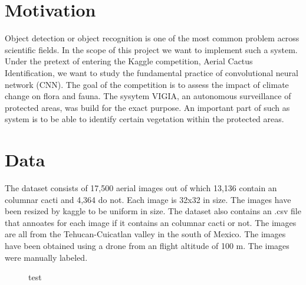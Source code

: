 \newcommand{\feat}{\texttt}







\section{Motivation}
Object detection or object recognition is one of the most common problem across scientific fields. In the scope of this project we want to implement such a system. Under the pretext of entering the Kaggle competition, Aerial Cactus Identification, we want to study the fundamental practice of convolutional neural network (CNN). The goal of the competition is to assess the impact of climate change on flora and fauna. The sysytem VIGIA, an autonomous surveillance of protected areas, was build for the exact purpose. An important part of such as system is to be able to identify certain vegetation within the protected areas.




\section{Data}
The dataset consists of 17,500 aerial images out of which 13,136 contain an columnar cacti  and 4,364 do not.  Each image is 32x32 in size. The images have been resized by kaggle to be uniform in size. The dataset also contains an .csv file that annoates for each image if it contains an columnar cacti or not. The images are all from the Tehucan-Cuicatlan valley in the south of Mexico.  \cite{LOPEZJIMENZ2019} The images have been obtained using a drone from an flight altitude of 100 m. The images were manually labeled.
      \begin{figure}[!htb]
        \caption{\label{fig1} test \cite{whit}}
      \end{figure}
